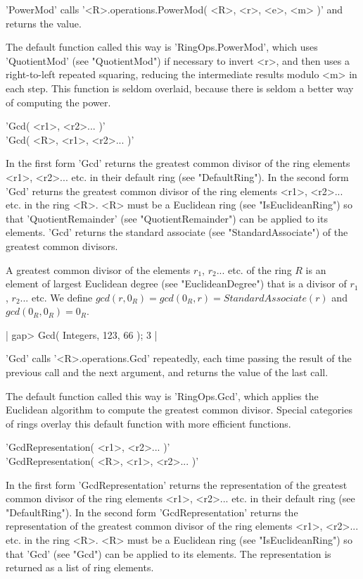 'PowerMod' calls  '<R>.operations.PowerMod( <R>,  <r>, <e>, <m>    )' and
returns the value.

The  default function called this way is  'RingOps.PowerMod',  which uses
'QuotientMod' (see "QuotientMod")  if  necessary to  invert <r>, and then
uses a right-to-left repeated squaring, reducing the intermediate results
modulo <m> in each step.  This function is seldom overlaid, because there
is seldom a better way of computing the power.


'Gcd( <r1>, <r2>... )' \\
'Gcd( <R>, <r1>, <r2>... )'

In  the  first form 'Gcd' returns the greatest common divisor of the ring
elements <r1>, <r2>... etc.   in their default  ring (see "DefaultRing").
In  the second form 'Gcd' returns the greatest common divisor of the ring
elements  <r1>,  <r2>... etc.  in the ring <R>.  <R> must be  a Euclidean
ring   (see   "IsEuclideanRing")   so   that   'QuotientRemainder'   (see
"QuotientRemainder")  can  be applied to its elements.  'Gcd' returns the
standard  associate  (see  "StandardAssociate")  of the  greatest  common
divisors.

A greatest common divisor of the elements  $r_1$, $r_2$...  etc.   of the
ring   $R$   is   an   element   of   largest   Euclidean   degree   (see
"EuclideanDegree") that is a  divisor of $r_1$,  $r_2$... etc.  We define
$gcd( r, 0_R  ) = gcd( 0_R, r ) = StandardAssociate( r )$  and $gcd( 0_R,
0_R ) = 0_R$.

|    gap> Gcd( Integers, 123, 66 );
    3 |

'Gcd' calls '<R>.operations.Gcd' repeatedly, each time passing the result
of the previous call and the next argument,  and returns the value of the
last call.

The default function called this way  is 'RingOps.Gcd', which applies the
Euclidean  algorithm to  compute the  greatest  common divisor.   Special
categories  of rings overlay this  default   function with more efficient
functions.


'GcdRepresentation( <r1>, <r2>... )' \\
'GcdRepresentation( <R>, <r1>, <r2>... )'

In the first  form 'GcdRepresentation' returns the representation  of the
greatest common divisor of the ring elements <r1>, <r2>... etc.  in their
default ring (see "DefaultRing").  In the second form 'GcdRepresentation'
returns  the representation of  the greatest  common  divisor of the ring
elements <r1>, <r2>... etc.  in  the ring <R>.  <R>  must be a  Euclidean
ring (see "IsEuclideanRing") so that 'Gcd'  (see "Gcd") can be applied to
its elements.  The representation is returned as a list of ring elements.

